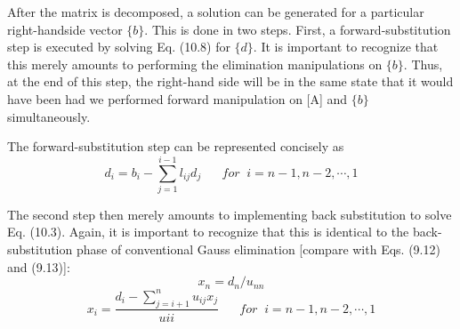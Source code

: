 \documentclass[../main.tex]{subfiles}
\begin{document}
After the matrix is decomposed, a solution can be generated for a particular right-handside vector $\{b\}$. This is done in two steps. First, a forward-substitution step is executed by solving Eq. (10.8) for $\{d\}$. It is important to recognize that this merely amounts to performing the elimination manipulations on $\{b\}$. Thus, at the end of this step, the right-hand side
will be in the same state that it would have been had we performed forward manipulation on [A] and $\{b\}$ simultaneously.

The forward-substitution step can be represented concisely as
\begin{equation}
d_{i}=b_{i}-\sum^{i-1}_{j=1}l_{ij}d_{j}
\; \; \; \; \; \;
for\; \; i=n-1,n-2,\cdots,1
\end{equation}

The second step then merely amounts to implementing back substitution to solve
Eq. (10.3). Again, it is important to recognize that this is identical to the back-substitution phase of conventional Gauss elimination [compare with Eqs. (9.12) and (9.13)]:
\begin{equation}
x_{n}=d_{n}/u_{nn}
\end{equation}
\begin{equation}
x_{i}=\frac{d_{i}-\sum^{n}_{j=i+1}u_{ij}x_{j}}{u{ii}}
\; \; \; \; \; \;
for\; \; i=n-1,n-2,\cdots,1
\end{equation}
\end{document}

